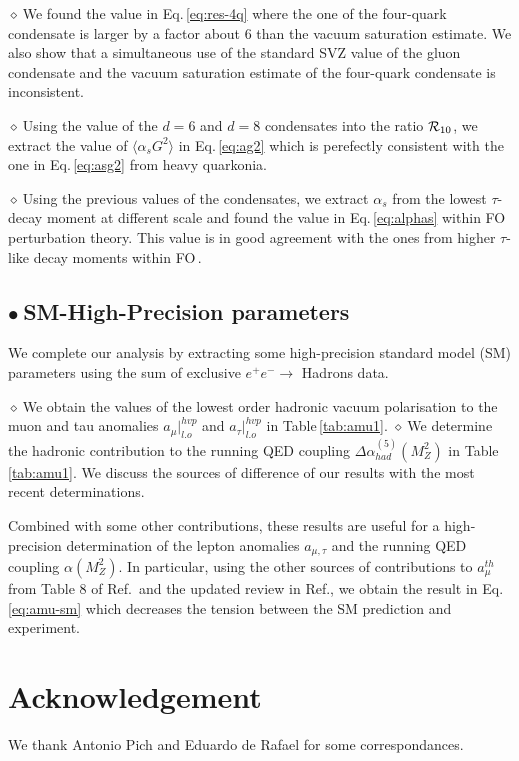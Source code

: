 \documentclass[review]{elsarticle}
\def\la{\langle}
\def\ra{\rangle}
\def\b{$\bullet~$}
\def\d{$\diamond~$}
\begin{document}
\d  We found the value in Eq.\,\ref{eq:res-4q} where the one of the four-quark condensate is larger by a factor about 6 than the vacuum saturation estimate. We also show that a simultaneous use of the standard SVZ value of the gluon condensate and the vacuum saturation estimate of the four-quark condensate is inconsistent. 

\d Using the value of the $d=6$ and $d=8$ condensates into the ratio ${\cal R}_{10}$, we extract the value of $\la\alpha_s G^2\ra$ in Eq.\,\ref{eq:ag2} which is perefectly consistent with the one in Eq.\,\ref{eq:asg2} from heavy quarkonia. 


\d Using the previous values of the condensates, we extract $\alpha_s$ from the lowest $\tau$-decay moment at different scale and found the value in Eq.\,\ref{eq:alphas} within FO perturbation theory. This value is in good agreement with the ones from higher $\tau$-like decay moments within FO\,\cite{PICH2}. 

\subsection*{\b SM-High-Precision parameters}
We complete our analysis by extracting some high-precision standard model (SM) parameters using the sum of exclusive $e^+e^-\to$ Hadrons data.

\d We obtain the values of the lowest order hadronic vacuum polarisation to the muon and tau anomalies $a_\mu\vert^{hvp}_{l.o}$ and $a_\tau\vert^{hvp}_{l.o}$ in Table\,\ref{tab:amu1}. 
\d We determine the hadronic contribution  to the running QED coupling $ \Delta \alpha_{had}^{(5)} (M_Z^2)$ in Table\,\ref{tab:amu1}. We discuss the sources of difference of our results with the most recent determinations.

Combined with some other contributions, these results are useful for a high-precision determination of the lepton anomalies $a_{\mu,\tau}$ and the running QED coupling $\alpha(M_Z^2)$.  In particular, using  the other sources of contributions to $a_\mu^{th}$ from Table 8 of Ref.\,\cite{KNECHT} and the updated review in Ref.\cite{GM2}, we obtain the result in Eq.\,\ref{eq:amu-sm} which decreases the tension between the SM prediction and experiment.  

\section*{Acknowledgement}
We thank %
Antonio Pich and  Eduardo de Rafael for some correspondances.
\newpage

\end{document}
